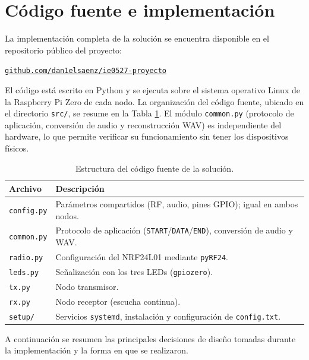 
\section{Código fuente e implementación}

La implementación completa de la solución se encuentra disponible en el repositorio público del proyecto:
\begin{center}
\href{https://github.com/dan1elsaenz/ie0527-proyecto}{\texttt{github.com/dan1elsaenz/ie0527-proyecto}}
\end{center}

El código está escrito en Python y se ejecuta sobre el sistema operativo Linux de la Raspberry Pi Zero de cada nodo.
La organización del código fuente, ubicado en el directorio \texttt{src/}, se resume en la Tabla \ref{tab:codigo}.
El módulo \texttt{common.py} (protocolo de aplicación, conversión de audio y reconstrucción WAV) es independiente del hardware, lo que permite verificar su funcionamiento sin tener los dispositivos físicos.

\begin{table}[htb]
    \centering
    \caption{Estructura del código fuente de la solución.}
    \label{tab:codigo}
    \begin{tabular}{@{}lp{6.5cm}@{}}
        \toprule
        Archivo & Descripción \\
        \midrule
        \texttt{config.py} & Parámetros compartidos (RF, audio, pines GPIO); igual en ambos nodos. \\
        \texttt{common.py} & Protocolo de aplicación (\texttt{START}/\texttt{DATA}/\texttt{END}), conversión de audio y WAV. \\
        \texttt{radio.py}  & Configuración del NRF24L01 mediante \texttt{pyRF24}. \\
        \texttt{leds.py}   & Señalización con los tres LEDs (\texttt{gpiozero}). \\
        \texttt{tx.py}     & Nodo transmisor. \\
        \texttt{rx.py}     & Nodo receptor (escucha continua). \\
        \texttt{setup/}    & Servicios \texttt{systemd}, instalación y configuración de \texttt{config.txt}. \\
        \bottomrule
    \end{tabular}
\end{table}

A continuación se resumen las principales decisiones de diseño tomadas durante la implementación y la forma en que se realizaron.


